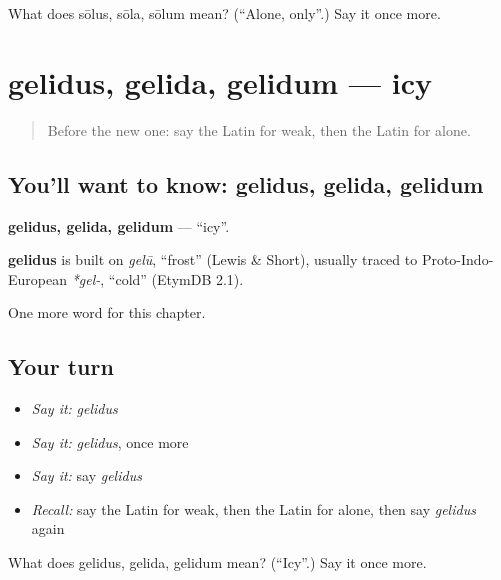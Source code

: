 \begin{tcolorbox}[breakable,colback=teal!4,colframe=teal!35!black,title={Before you move on}]
What does sōlus, sōla, sōlum mean? (\textquotedblleft{}Alone, only\textquotedblright{}.) Say it once more.
\end{tcolorbox}
\section[gelidus, gelida, gelidum]{gelidus, gelida, gelidum — icy}

\label{lesson:LA-C152-gelidus}



\begin{quote}
Before the new one: say the Latin for weak, then the Latin for alone.
\end{quote}

\subsection*{You'll want to know: gelidus, gelida, gelidum}
\textbf{gelidus, gelida, gelidum} — \textquotedblleft{}icy\textquotedblright{}.

\begin{cousinweb}
\textbf{gelidus} is built on \emph{gelū}, \textquotedblleft{}frost\textquotedblright{} (Lewis \& Short), usually traced to Proto-Indo-European \emph{*gel-}, \textquotedblleft{}cold\textquotedblright{} (EtymDB 2.1).
\end{cousinweb}

\begin{grammarlens}[title={What you've built}]
One more word for this chapter.
\end{grammarlens}

\subsection*{Your turn}
\begin{itemize}
\raggedright
  \item \emph{Say it:} \emph{gelidus}
  \item \emph{Say it:} \emph{gelidus}, once more
  \item \emph{Say it:} say \emph{gelidus}
  \item \emph{Recall:} say the Latin for weak, then the Latin for alone, then say \emph{gelidus} again
\end{itemize}

\begin{tcolorbox}[breakable,colback=teal!4,colframe=teal!35!black,title={Before you move on}]
What does gelidus, gelida, gelidum mean? (\textquotedblleft{}Icy\textquotedblright{}.) Say it once more.
\end{tcolorbox}
